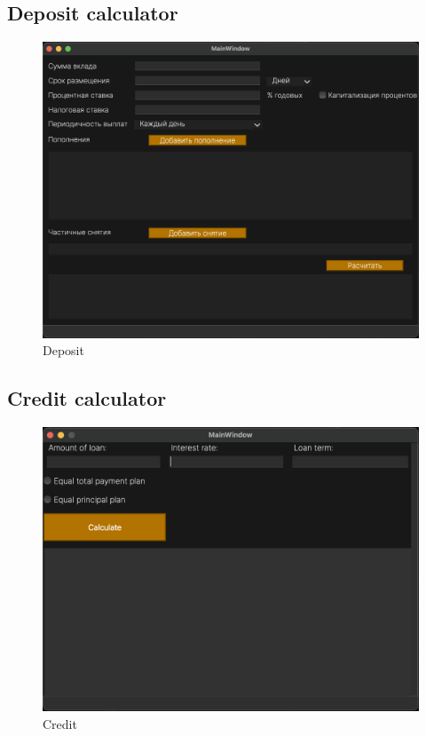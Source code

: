 \documentclass[]{article}
\begin{document}
\subsection{Deposit calculator}\label{deposit-calculator}

\begin{figure}[htbp]
\centering
\includegraphics{pics/deposit.png}
\caption{Deposit}
\end{figure}

\subsection{Credit calculator}\label{credit-calculator}

\begin{figure}[htbp]
\centering
\includegraphics{pics/credit.png}
\caption{Credit}
\end{figure}
\end{document}
